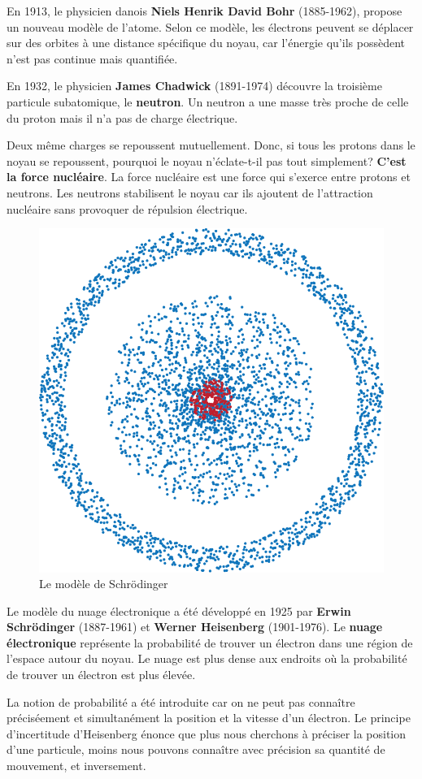 \documentclass[
  11pt,
  a4paper,
  openany]{book}
\begin{document}
En 1913, le physicien danois \textbf{Niels Henrik David Bohr} (1885-1962), propose un nouveau modèle de l'atome. Selon ce modèle, les électrons peuvent se déplacer sur des orbites à une distance spécifique du noyau, car l'énergie qu'ils possèdent n'est pas continue mais quantifiée.

En 1932, le physicien \textbf{James Chadwick} (1891-1974) découvre la troisième particule subatomique, le \textbf{neutron}. Un neutron a une masse très proche de celle du proton mais il n'a pas de charge électrique.

Deux même charges se repoussent mutuellement. Donc, si tous les protons dans le noyau se repoussent, pourquoi le noyau n'éclate-t-il pas tout simplement? \textbf{C'est la force nucléaire}. La force nucléaire est une force qui s'exerce entre protons et neutrons. Les neutrons stabilisent le noyau car ils ajoutent de l'attraction nucléaire sans provoquer de répulsion électrique.

\begin{figure}

{\centering \includegraphics[width=0.25\linewidth]{images/modeles-atomiques-cloud} 

}

\caption{Le modèle de Schrödinger}\label{fig:modeles-atomiques-cloud}
\end{figure}

Le modèle du nuage électronique a été développé en 1925 par \textbf{Erwin Schrödinger} (1887-1961) et \textbf{Werner Heisenberg} (1901-1976). Le \textbf{nuage électronique} représente la probabilité de trouver un électron dans une région de l'espace autour du noyau. Le nuage est plus dense aux endroits où la probabilité de trouver un électron est plus élevée.

\newpage

La notion de probabilité a été introduite car on ne peut pas connaître préciséement et simultanément la position et la vitesse d'un électron. Le principe d'incertitude d'Heisenberg énonce que plus nous cherchons à préciser la position d'une particule, moins nous pouvons connaître avec précision sa quantité de mouvement, et inversement.
\end{document}
